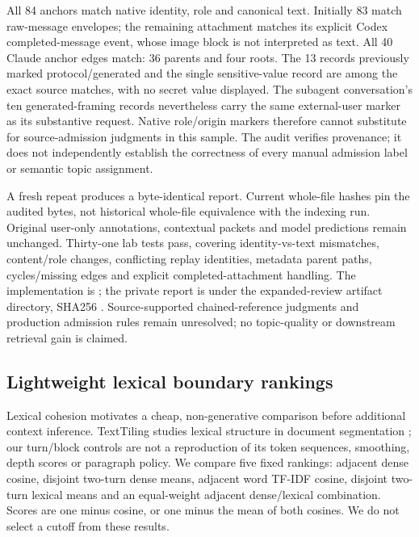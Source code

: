 \documentclass[11pt]{article}
\begin{document}
All 84 anchors match native identity, role and canonical text. Initially 83
match raw-message envelopes; the remaining attachment matches its explicit
Codex completed-message event, whose image block is not interpreted as text.
All 40 Claude anchor edges match: 36 parents and four roots. The 13 records
previously marked protocol/generated and the single sensitive-value record
are among the exact source matches, with no secret value displayed. The
subagent conversation's ten generated-framing records nevertheless carry the
same external-user marker as its substantive request. Native role/origin
markers therefore cannot substitute for source-admission judgments in this
sample. The audit verifies provenance; it does not independently establish
the correctness of every manual admission label or semantic topic assignment.

A fresh repeat produces a byte-identical report. Current whole-file hashes pin
the audited bytes, not historical whole-file equivalence with the indexing run.
Original user-only annotations, contextual packets and model predictions remain
unchanged. Thirty-one lab tests pass, covering identity-vs-text mismatches,
content/role changes, conflicting replay identities, metadata parent paths,
cycles/missing edges and explicit completed-attachment handling. The implementation
is ; the private report
 is under the expanded-review artifact directory,
SHA256 .
Source-supported chained-reference judgments and production admission rules
remain unresolved; no topic-quality or downstream retrieval gain is claimed.

\subsection{Lightweight lexical boundary rankings}
Lexical cohesion motivates a cheap, non-generative comparison before additional
context inference. TextTiling studies lexical structure in document segmentation
\cite{texttiling}; our turn/block controls are not a reproduction of its token
sequences, smoothing, depth scores or paragraph policy. We compare five fixed
rankings: adjacent dense cosine, disjoint two-turn dense means, adjacent word
TF-IDF cosine, disjoint two-turn lexical means and an equal-weight adjacent
dense/lexical combination. Scores are one minus cosine, or one minus the mean
of both cosines. We do not select a cutoff from these results.
\end{document}
